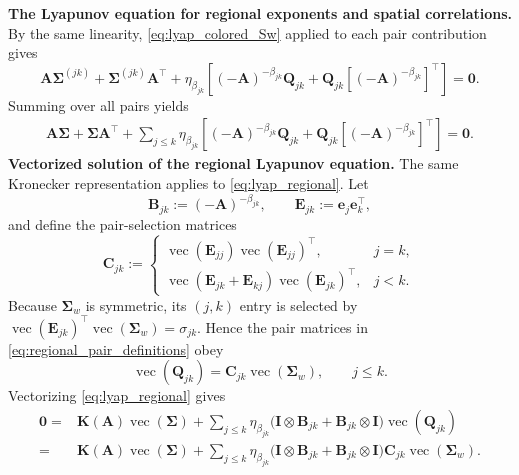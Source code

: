 \documentclass[12pt]{article}
\newcommand{\vc}{\operatorname{vec}}
\begin{document}
\textbf{The Lyapunov equation for regional exponents and spatial correlations.}
By the same linearity, \eqref{eq:lyap_colored_Sw} applied to each pair contribution gives
\begin{equation}
\mathbf A\boldsymbol{\Sigma}^{(jk)}+\boldsymbol{\Sigma}^{(jk)}\mathbf A^\top
+\eta_{\beta_{jk}}\left[
(-\mathbf A)^{-\beta_{jk}}\mathbf Q_{jk}
+\mathbf Q_{jk}[(-\mathbf A)^{-\beta_{jk}}]^\top
\right]=\mathbf0.
\label{eq:regional_lyapunov_part}
\end{equation}
Summing over all pairs yields
\begin{equation}
\boxed{
\begin{aligned}
\mathbf A\boldsymbol{\Sigma}+\boldsymbol{\Sigma}\mathbf A^\top
+\sum_{j\leq k}\eta_{\beta_{jk}}\left[
(-\mathbf A)^{-\beta_{jk}}\mathbf Q_{jk}
+\mathbf Q_{jk}[(-\mathbf A)^{-\beta_{jk}}]^\top
\right]=\mathbf0 .
\end{aligned}}
\label{eq:lyap_regional}
\end{equation}
\textbf{Vectorized solution of the regional Lyapunov equation.}
The same Kronecker representation applies to \eqref{eq:lyap_regional}. Let
\begin{equation}
\mathbf B_{jk}:=(-\mathbf A)^{-\beta_{jk}},
\qquad
\mathbf E_{jk}:=\mathbf e_j\mathbf e_k^\top,
\label{eq:regional_vector_definitions}
\end{equation}
and define the pair-selection matrices
\begin{equation}
\mathbf C_{jk}:=
\begin{cases}
\vc(\mathbf E_{jj})\vc(\mathbf E_{jj})^\top,&j=k,\\
\vc(\mathbf E_{jk}+\mathbf E_{kj})\vc(\mathbf E_{jk})^\top,&j<k.
\end{cases}
\label{eq:regional_pair_selector}
\end{equation}
Because $\boldsymbol\Sigma_w$ is symmetric, its $(j,k)$ entry is selected by
$\vc(\mathbf E_{jk})^\top\vc(\boldsymbol\Sigma_w)=\sigma_{jk}$. Hence the pair matrices in
\eqref{eq:regional_pair_definitions} obey
\begin{equation}
\vc(\mathbf Q_{jk})=\mathbf C_{jk}\vc(\boldsymbol\Sigma_w),
\qquad j\leq k.
\label{eq:vec_regional_pair}
\end{equation}
Vectorizing \eqref{eq:lyap_regional} gives
\begin{equation}
\begin{aligned}
\mathbf 0
={}&\mathbf K(\mathbf A)\vc(\boldsymbol\Sigma)
+\sum_{j\leq k}\eta_{\beta_{jk}}
\bigl(\mathbf I\otimes\mathbf B_{jk}
+\mathbf B_{jk}\otimes\mathbf I\bigr)\vc(\mathbf Q_{jk})\\
={}&\mathbf K(\mathbf A)\vc(\boldsymbol\Sigma)
+\sum_{j\leq k}\eta_{\beta_{jk}}
\bigl(\mathbf I\otimes\mathbf B_{jk}
+\mathbf B_{jk}\otimes\mathbf I\bigr)\mathbf C_{jk}
\vc(\boldsymbol\Sigma_w).
\end{aligned}
\label{eq:vec_regional_linear_system}
\end{equation}
\end{document}
